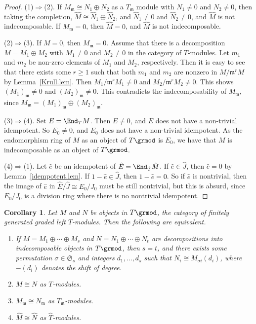 \documentclass[11pt,leqno]{article}
\newtheorem{corollary}[theorem]{Corollary}
\theoremstyle{definition}
\theoremstyle{remark}
\theoremstyle{remark}
\newcommand{\fm}{\ensuremath{\mathfrak m}}
\let\frak\mathfrak
\def\fm{\mathfrak{m}}
\begin{document}
\begin{proof}
  (1)$\Rightarrow$(2).
  If $M_\fm\cong N_1\oplus N_2$ as a $T_\fm$ module with $N_1\neq 0$ and $N_2\neq 0$, then
  taking the completion, $\hat M \cong \hat N_1\oplus \hat N_2$, and $\hat N_1\neq 0$ and $\hat N_2
  \neq 0$, and $\hat M$ is not indecomposable.
  If $M_\fm=0$, then $\hat M=0$, and $\hat M$ is not indecomposable.

  (2)$\Rightarrow$(3).
  If $M=0$, then $M_\fm=0$.
  Assume that
  there is a decomposition $M=M_1\oplus M_2$ with $M_1\neq 0$ and $M_2\neq 0$ in the category of $T$-modules.
  Let $m_1$ and $m_2$ be non-zero elements of $M_1$ and $M_2$, respectively.
  Then it is easy to see that there exists some $r\ge 1$ such that both $m_1$ and $m_2$ are nonzero in
  $M/\fm^rM$ by Lemma~\ref{Krull.lem}.
  Then $M_1/\fm^r M_1\neq 0$ and $M_2/\fm^r M_2\neq 0$.
  This shows $(M_1)_\fm\neq 0$ and $(M_2)_\fm\neq 0$.
  This contradicts the indecomposability of $M_\fm$, since $M_\fm=(M_1)_\fm\oplus (M_2)_\fm$.
  
  (3)$\Rightarrow$(4).
  Set $E=\End_TM$.
  Then $E\neq 0$, and $E$ does not have a non-trivial idempotent.
  So $E_0\neq 0$, and $E_0$ does not have a non-trivial idempotent.
  As the endomorphism ring of $M$ as an object of $T\grmod$ is $E_0$,
  we have that $M$ is indecomposable as an object of $T\grmod$.

  (4)$\Rightarrow$(1).
  Let $\hat e$ be an idempotent of $\hat E=\End_{\hat T}\hat M$.
  If $\hat e\in \hat J$, then $\hat e=0$ by Lemma~\ref{idempotent.lem}.
  If $1-\hat e\in \hat J$, then $1-\hat e=0$.
  So if $\hat e$ is nontrivial, then the image of $\hat e$ in $\hat E/\hat J\cong E_0/J_0$
  must be still nontrivial, but this is absurd, since $E_0/J_0$ is a division ring where
  there is no nontrivial idempotent.
\end{proof}

\begin{corollary}\label{main.cor}
  Let $M$ and $N$ be objects in $T\grmod$, the category of finitely generated graded left $T$-modules.
  Then the following are equivalent.
  \begin{enumerate}
  \item[\rm(1)] If $M=M_1\oplus\cdots\oplus M_s$ and $N=N_1\oplus\cdots\oplus N_t$ are
    decompositions into indecomposable objects in $T\grmod$, then $s=t$, and
    there exists some permutation $\sigma\in \frak S_s$ and integers $d_1,\ldots,d_s$
    such that $N_i\cong M_{\sigma i}(d_i)$, where $-(d_i)$ denotes the shift of degree.
  \item[\rm(2)] $M\cong N$ as $T$-modules.
  \item[\rm(3)] $M_\fm\cong N_\fm$ as $T_\fm$-modules.
    \item[\rm(4)] $\hat M\cong \hat N$ as $\hat T$-modules.
  \end{enumerate}
\end{corollary}
\end{document}
